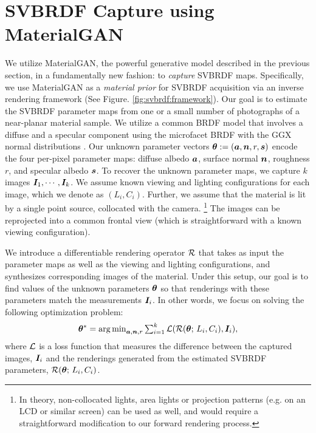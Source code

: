 \section{SVBRDF Capture using MaterialGAN}
\label{sec:svbrdf:framework}



We utilize MaterialGAN, the powerful generative model described in the previous section, in a fundamentally new fashion: to \emph{capture} SVBRDF maps.
Specifically, we use MaterialGAN as a \emph{material prior} for SVBRDF acquisition via an inverse rendering framework (See Figure. \ref{fig:svbrdf:framework}).
Our goal is to estimate the SVBRDF parameter maps from one or a small number of photographs of a near-planar material sample.
We utilize a common BRDF model that involves a diffuse and a specular component using the microfacet BRDF with the GGX normal distributions \cite{walter2007microfacet}.
Our unknown parameter vectors $\bm\theta := (\bm{a},\bm{n},r,\bm{s})$ encode the four per-pixel parameter maps: diffuse albedo $\bm{a}$, surface normal $\bm{n}$, roughness $r$, and specular albedo $\bm{s}$.
To recover the unknown parameter maps, we capture $k$ images $\bm{I}_1, \cdots, \bm{I}_k$.
We assume known viewing and lighting configurations for each image, which we denote as $(L_i, C_i)$.
Further, we assume that the material is lit by a single point source, collocated with the camera.
\footnote{
	In theory, non-collocated lights, area lights or projection patterns (e.g. on an LCD or similar screen) can be used as well, and would require a straightforward modification to our forward rendering process.
}
The images can be reprojected into a common frontal view (which is straightforward with a known viewing configuration).

We introduce a differentiable rendering operator $\mathcal{R}$ that takes as input the parameter maps as well as the viewing and lighting configurations, and synthesizes corresponding images of the material.
Under this setup, our goal is to find values of the unknown parameters $\bm\theta$ so that renderings with these parameters match the measurements $\bm{I}_i$.
In other words, we focus on solving the following optimization problem:
\begin{equation}
	\label{eq:opt1}
	\bm\theta^* = \textstyle\operatorname*{arg\,min}_{\bm{a}, \bm{n}, r} \sum_{i=1}^k \mathcal{L}(\mathcal{R}(\bm\theta; \,L_i, C_i), \bm{I}_i),
\end{equation}
where $\mathcal{L}$ is a loss function that measures the difference between the captured images, $\bm{I}_i$ and the renderings generated from the estimated SVBRDF parameters, $\mathcal{R}(\bm\theta; \,L_i, C_i)$.


